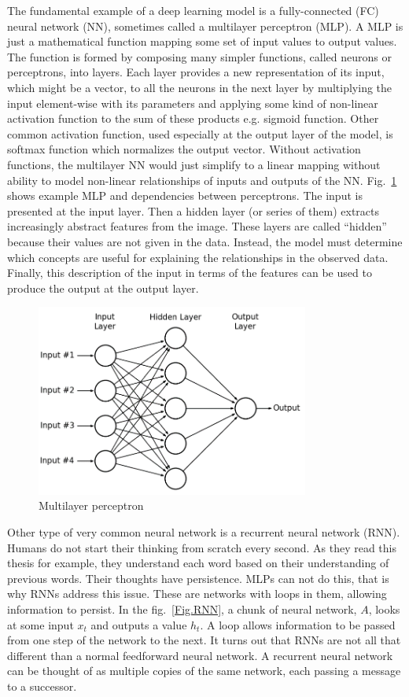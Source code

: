 The fundamental example of a deep learning model is a fully-connected (FC) neural network (NN), sometimes called a multilayer perceptron (MLP). A MLP is just a mathematical function mapping some set of input values to output values. The function is formed by composing many simpler functions, called neurons or perceptrons, into layers. Each layer provides a new representation of its input, which might be a vector, to all the neurons in the next layer by multiplying the input element-wise with its parameters and applying some kind of non-linear activation function to the sum of these products e.g. sigmoid function. Other common activation function, used especially at the output layer of the model, is softmax function which normalizes the output vector. Without activation functions, the multilayer NN would just simplify to a linear mapping without ability to model non-linear relationships of inputs and outputs of the NN. Fig.~\ref{Fig.MLP} shows example MLP and dependencies between perceptrons. The input is presented at the input layer. Then a hidden layer (or series of them) extracts increasingly abstract features from the image. These layers are called “hidden” because their values are not given in the data. Instead, the model must determine which concepts are useful for explaining the relationships in the observed data. Finally, this description of the input in terms of the features can be used to produce the output at the output layer.

\begin{figure}[H]
\includegraphics[width=0.8\textwidth,keepaspectratio]{figures/MLP.png}
\caption{Multilayer perceptron}
\label{Fig.MLP}
\end{figure}

Other type of very common neural network is a recurrent neural network (RNN). Humans do not start their thinking from scratch every second. As they read this thesis for example, they understand each word based on their understanding of previous words. Their thoughts have persistence. MLPs can not do this, that is why RNNs address this issue. These are networks with loops in them, allowing information to persist. In the fig.~\ref{Fig.RNN}, a chunk of neural network, $A$, looks at some input $x_t$ and outputs a value $h_t$. A loop allows information to be passed from one step of the network to the next. It turns out that RNNs are not all that different than a normal feedforward neural network. A recurrent neural network can be thought of as multiple copies of the same network, each passing a message to a successor.

